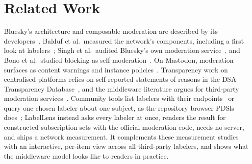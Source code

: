 \section{Related Work}
\label{sec:related}
Bluesky's architecture and composable moderation are described by its developers~\cite{Kleppmann_2024,Bluesky_2023}. Balduf et al.\ measured the network's components, including a first look at labelers~\cite{Balduf_2024}; Singh et al.\ audited Bluesky's own moderation service~\cite{Singh_2026}, and Bono et al.\ studied blocking as self-moderation~\cite{Bono_2026}. On Mastodon, moderation surfaces as content warnings and instance policies~\cite{Zignani_2019}. Transparency work on centralised platforms relies on self-reported statements of reasons in the DSA Transparency Database~\cite{Trujillo_2025,Drolsbach_2024}, and the middleware literature argues for third-party moderation services~\cite{Hogg_2024,Gillespie_2019}. Community tools list labelers with their endpoints~\cite{Mackuba_labellers} or query one chosen labeler about one subject, as the repository browser PDSls does~\cite{PDSls}; LabelLens instead asks every labeler at once, renders the result for constructed subscription sets with the official moderation code, needs no server, and ships a network measurement. It complements these measurement studies with an interactive, per-item view across all third-party labelers, and shows what the middleware model looks like to readers in practice.
